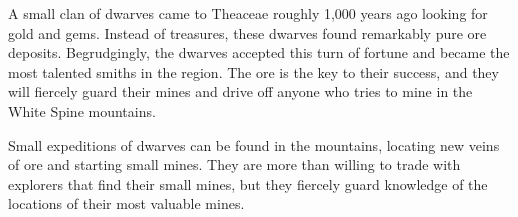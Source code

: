 A small clan of dwarves came to Theaceae roughly 1,000 years ago looking for gold and gems.
Instead of treasures, these dwarves found remarkably pure ore deposits.
Begrudgingly, the dwarves accepted this turn of fortune and became the most talented smiths in the region.
The ore is the key to their success, and they will fiercely guard their mines and drive off anyone who tries to mine in the White Spine mountains.

Small expeditions of dwarves can be found in the mountains, locating new veins of ore and starting small mines.
They are more than willing to trade with explorers that find their small mines, but they fiercely guard knowledge of the locations of their most valuable mines.
